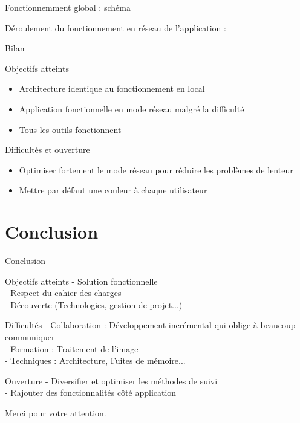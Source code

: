 \documentclass{beamer}
\begin{document}
		\begin{frame}{Fonctionnemment global : schéma}
		
		Déroulement du fonctionnement en réseau de l'application :
			\begin{center}
			\scalebox{0.5}{} 
			\end{center}
		\end{frame}
		
		\begin{frame}{Bilan}
			\begin{exampleblock}{Objectifs atteints}
				\begin{itemize}
				\item Architecture identique au fonctionnement en local
				\item Application fonctionnelle en mode réseau malgré la difficulté
				\item Tous les outils fonctionnent
				\end{itemize}
			\end{exampleblock}
			\pause
			\begin{alertblock}{Difficultés et ouverture}
				\begin{itemize}
				\item Optimiser fortement le mode réseau pour réduire les problèmes de lenteur
				\item Mettre par défaut une couleur à chaque utilisateur
				\end{itemize}
			\end{alertblock}
		\end{frame}

	\section{Conclusion}
		\begin{frame}{Conclusion}
			\begin{exampleblock}{Objectifs atteints}
				- Solution fonctionnelle \\
				- Respect du cahier des charges \\
				- Découverte (Technologies, gestion de projet...) \\ 
			\end{exampleblock}
			\pause
			\begin{alertblock}{Difficultés}
				- Collaboration : Développement incrémental qui oblige à beaucoup communiquer \\
				- Formation : Traitement de l'image \\
				- Techniques : Architecture, Fuites de mémoire...\\
			\end{alertblock}
			\pause
			\begin{block}{Ouverture}
				- Diversifier et optimiser les méthodes de suivi \\
				- Rajouter des fonctionnalités côté application \\
			\end{block}
		\end{frame}
	
	\begin{frame}
		\begin{center}
			\huge{Merci pour votre attention.} \\
		\end{center}
	\end{frame}
\end{document}
